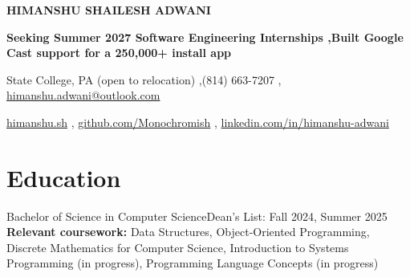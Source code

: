 



\begin{center}
  {\LARGE\bfseries HIMANSHU SHAILESH ADW{}ANI}\par\vspace{3pt}
  {\bfseries Seeking Summer 2027 Software Engineering Internships \sep Built Google Cast support for a 250,000+ install app}\par\vspace{2pt}
  State College, PA (open to relocation) \sep (814) 663-7207 \sep
  \href{mailto:himanshu.adwani@outlook.com}{himanshu.adwani@outlook.com}\par
  \href{https://himanshu.sh}{himanshu.sh} \sep
  \href{https://github.com/Monochromish}{github.com/Monochromish} \sep
  \href{https://www.linkedin.com/in/himanshu-adwani}{linkedin.com/in/himanshu-adwani}
\end{center}\vspace{-6pt}

\section{Education}
      {Bachelor of Science in Computer Science}{Dean's List: Fall 2024, Summer 2025}
\vspace{3pt}
\textbf{Relevant coursework:} Data Structures, Object-Oriented Programming, Discrete Mathematics for Computer Science,
Introduction to Systems Programming (in progress), Programming Language Concepts (in progress)\par
\vspace{2pt}

